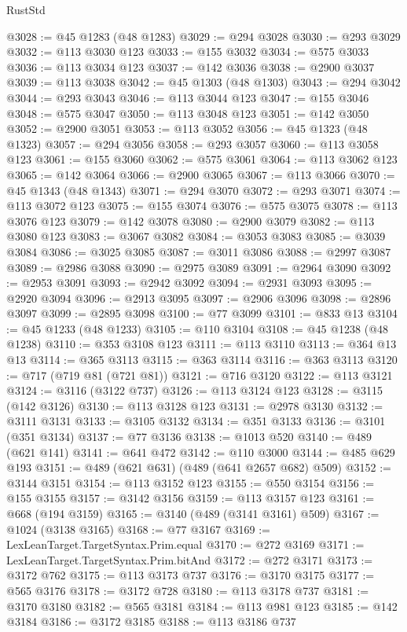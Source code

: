 \begin{lexlean}{RustStd}
\begin{coremodule}
@3028 := @45 @1283 (@48 @1283)
@3029 := @294 @3028
@3030 := @293 @3029
@3032 := @113 @3030 @123
@3033 := @155 @3032
@3034 := @575 @3033
@3036 := @113 @3034 @123
@3037 := @142 @3036
@3038 := @2900 @3037
@3039 := @113 @3038
@3042 := @45 @1303 (@48 @1303)
@3043 := @294 @3042
@3044 := @293 @3043
@3046 := @113 @3044 @123
@3047 := @155 @3046
@3048 := @575 @3047
@3050 := @113 @3048 @123
@3051 := @142 @3050
@3052 := @2900 @3051
@3053 := @113 @3052
@3056 := @45 @1323 (@48 @1323)
@3057 := @294 @3056
@3058 := @293 @3057
@3060 := @113 @3058 @123
@3061 := @155 @3060
@3062 := @575 @3061
@3064 := @113 @3062 @123
@3065 := @142 @3064
@3066 := @2900 @3065
@3067 := @113 @3066
@3070 := @45 @1343 (@48 @1343)
@3071 := @294 @3070
@3072 := @293 @3071
@3074 := @113 @3072 @123
@3075 := @155 @3074
@3076 := @575 @3075
@3078 := @113 @3076 @123
@3079 := @142 @3078
@3080 := @2900 @3079
@3082 := @113 @3080 @123
@3083 := @3067 @3082
@3084 := @3053 @3083
@3085 := @3039 @3084
@3086 := @3025 @3085
@3087 := @3011 @3086
@3088 := @2997 @3087
@3089 := @2986 @3088
@3090 := @2975 @3089
@3091 := @2964 @3090
@3092 := @2953 @3091
@3093 := @2942 @3092
@3094 := @2931 @3093
@3095 := @2920 @3094
@3096 := @2913 @3095
@3097 := @2906 @3096
@3098 := @2896 @3097
@3099 := @2895 @3098
@3100 := @77 @3099
@3101 := @833 @13
@3104 := @45 @1233 (@48 @1233)
@3105 := @110 @3104
@3108 := @45 @1238 (@48 @1238)
@3110 := @353 @3108 @123
@3111 := @113 @3110
@3113 := @364 @13 @13
@3114 := @365 @3113
@3115 := @363 @3114
@3116 := @363 @3113
@3120 := @717 (@719 @81 (@721 @81))
@3121 := @716 @3120
@3122 := @113 @3121
@3124 := @3116 (@3122 @737)
@3126 := @113 @3124 @123
@3128 := @3115 (@142 @3126)
@3130 := @113 @3128 @123
@3131 := @2978 @3130
@3132 := @3111 @3131
@3133 := @3105 @3132
@3134 := @351 @3133
@3136 := @3101 (@351 @3134)
@3137 := @77 @3136
@3138 := @1013 @520
@3140 := @489 (@621 @141)
@3141 := @641 @472
@3142 := @110 @3000
@3144 := @485 @629 @193
@3151 := @489 (@621 @631) (@489 (@641 @2657 @682) @509)
@3152 := @3144 @3151
@3154 := @113 @3152 @123
@3155 := @550 @3154
@3156 := @155 @3155
@3157 := @3142 @3156
@3159 := @113 @3157 @123
@3161 := @668 (@194 @3159)
@3165 := @3140 (@489 (@3141 @3161) @509)
@3167 := @1024 (@3138 @3165)
@3168 := @77 @3167
@3169 := LexLeanTarget.TargetSyntax.Prim.equal
@3170 := @272 @3169
@3171 := LexLeanTarget.TargetSyntax.Prim.bitAnd
@3172 := @272 @3171
@3173 := @3172 @762
@3175 := @113 @3173 @737
@3176 := @3170 @3175
@3177 := @565 @3176
@3178 := @3172 @728
@3180 := @113 @3178 @737
@3181 := @3170 @3180
@3182 := @565 @3181
@3184 := @113 @981 @123
@3185 := @142 @3184
@3186 := @3172 @3185
@3188 := @113 @3186 @737

\end{coremodule}
\end{lexlean}
